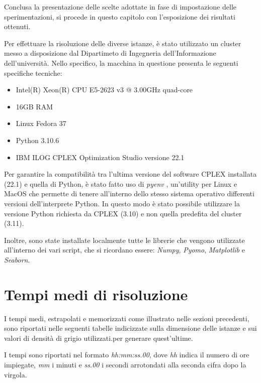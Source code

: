 Conclusa la presentazione delle scelte adottate in fase di impostazione delle sperimentazioni, 
si procede in questo capitolo con l'esposizione dei risultati ottenuti. 

Per effettuare la risoluzione delle diverse istanze, è stato utilizzato un cluster messo a disposizione dal Dipartimeto di Ingegneria dell'Informazione 
dell'università. Nello specifico, la macchina in questione presenta le seguenti specifiche tecniche:
\begin{itemize}
\item Intel(R) Xeon(R) CPU E5-2623 v3 @ 3.00GHz quad-core
\item 16GB RAM
\item Linux Fedora 37
\item Python 3.10.6
\item IBM ILOG CPLEX Optimization Studio versione 22.1
\end{itemize}
Per garantire la compatibilità tra l'ultima versione del software CPLEX installata (22.1) e quella di Python, è stato fatto uso di \textit{pyenv} \cite{pyenv}, 
un'utility per Linux e MacOS che permette di tenere all'interno dello stesso sistema operativo differenti versioni dell'interprete Python. In questo modo 
è stato possibile utilizzare la versione Python richiesta da CPLEX (3.10) e non quella predefita del cluster (3.11).

Inoltre, sono state installate localmente tutte le librerie che vengono utilizzate all'interno dei vari script, che si ricordano 
essere: \textit{Numpy}, \textit{Pyomo}, \textit{Matplotlib} e \textit{Seaborn}.

\newpage
\section{Tempi medi di risoluzione}
I tempi medi, estrapolati e memorizzati come illustrato nelle sezioni precedenti, sono riportati nelle seguenti tabelle indicizzate sulla dimensione delle istanze 
e sui valori di densità di grigio utilizzati.per generare quest'ultime.

I tempi sono riportati nel formato \textit{hh:mm:ss.00}, dove \textit{hh} indica il numero di ore impiegate, \textit{mm} i minuti e \textit{ss.00} i secondi arrotondati 
alla seconda cifra dopo la virgola. \\

